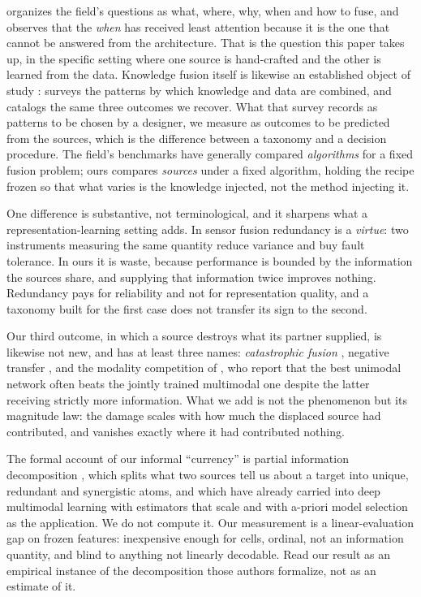 \citet{dasarathy2001what} organizes the field's questions as what, where, why,
when and how to fuse, and observes that the \emph{when} has received least
attention because it is the one that cannot be answered from the architecture.
That is the question this paper takes up, in the specific setting where one
source is hand-crafted and the other is learned from the data. Knowledge
fusion itself is likewise an established object of study
\citep{khaleghi2013multisensor}: \citet{smirnov2019knowledge} surveys the
patterns
by which knowledge and data are combined, and catalogs the same three outcomes
we recover. What that survey records as patterns to be chosen by a designer, we
measure as outcomes to be predicted from the sources, which is the difference
between a taxonomy and a decision procedure. The field's benchmarks have
generally compared \emph{algorithms} for a fixed fusion problem; ours compares
\emph{sources} under a fixed algorithm, holding the recipe frozen so that what
varies is the knowledge injected, not the method injecting it.

One difference is substantive, not terminological, and it sharpens what a
representation-learning setting adds. In sensor fusion redundancy is a
\emph{virtue}: two instruments measuring the same quantity reduce variance and
buy fault tolerance. In ours it is waste, because performance is bounded by the
information the sources share, and supplying that information twice improves
nothing.
Redundancy pays for reliability and not for representation quality, and a
taxonomy built for the first case does not transfer its sign to the second.

Our third outcome, in which a source destroys what its partner supplied, is
likewise not new, and has at least three names: \emph{catastrophic fusion}
\citep{movellan1997catastrophic}, negative transfer \citep{wang2019negative},
and the modality competition of \citet{wang2020multimodal}, who report
that the best unimodal network often beats the jointly trained multimodal one
despite the latter receiving strictly more information. What we add is not the
phenomenon but its magnitude law: the damage scales with how much the displaced
source had contributed, and vanishes exactly where it had contributed nothing.

The formal account of our informal ``currency'' is partial information
decomposition \citep{williams2010nonnegative}, which splits what two sources
tell us about a target into unique, redundant and synergistic atoms, and which
\citet{liang2023quantifying} have already carried into deep multimodal learning
with estimators that scale and with a-priori model selection as the
application. We do not compute it. Our measurement is a linear-evaluation gap
on frozen features: inexpensive enough for \computeCells{} cells, ordinal, not
an information quantity, and blind to anything not linearly decodable. Read our
result as an empirical instance of the decomposition those authors formalize,
not as an estimate of it.

